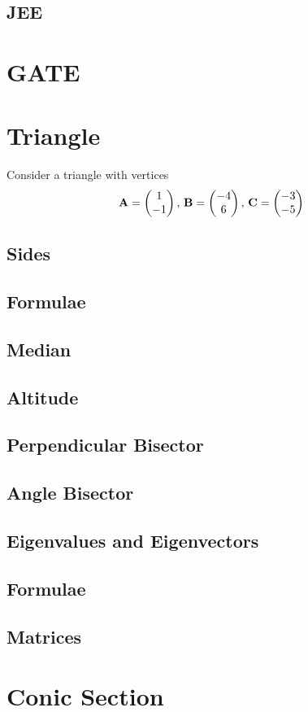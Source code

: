 \documentclass[journal]{IEEEtran}
\begin{document}
\subsection{JEE}
 
\newpage
\section{GATE}

\newpage
\appendices
\section{Triangle}
Consider a triangle with vertices
		\begin{align}
			\label{eq:app-tri-pts}
			\mathbf{A} = \begin{pmatrix}1 \\ -1\end{pmatrix},\,
			\mathbf{B} = \begin{pmatrix}-4 \\ 6\end{pmatrix},\,
			\mathbf{C} = \begin{pmatrix}-3 \\ -5\end{pmatrix}
		\end{align}
\subsection{Sides}

\subsection{Formulae}

\subsection{Median}

\subsection{Altitude}

\subsection{Perpendicular Bisector}

\subsection{Angle Bisector}

\subsection{Eigenvalues and Eigenvectors}

\subsection{Formulae}

\subsection{Matrices}

\newpage
\section{Conic Section}

\fi
\end{document}
